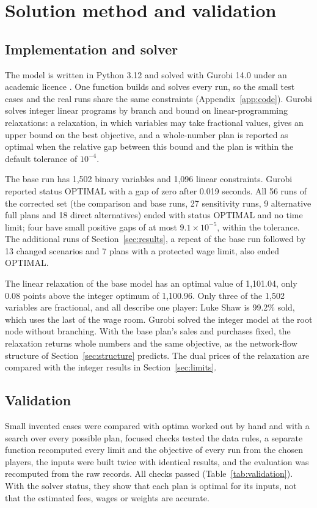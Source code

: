 \section{Solution method and validation}\label{sec:method}

\subsection{Implementation and solver}

The model is written in Python 3.12 and solved with Gurobi 14.0 under an academic licence \citep{gurobi2026}. One function builds and solves every run, so the small test cases and the real runs share the same constraints (Appendix~\ref{app:code}). Gurobi solves integer linear programs by branch and bound on linear-programming relaxations: a relaxation, in which variables may take fractional values, gives an upper bound on the best objective, and a whole-number plan is reported as optimal when the relative gap between this bound and the plan is within the default tolerance of $10^{-4}$.

The base run has 1,502 binary variables and 1,096 linear constraints. Gurobi reported status OPTIMAL with a gap of zero after 0.019 seconds. All 56 runs of the corrected set (the comparison and base runs, 27 sensitivity runs, 9 alternative full plans and 18 direct alternatives) ended with status OPTIMAL and no time limit; four have small positive gaps of at most $9.1 \times 10^{-5}$, within the tolerance. The additional runs of Section~\ref{sec:results}, a repeat of the base run followed by 13 changed scenarios and 7 plans with a protected wage limit, also ended OPTIMAL.

The linear relaxation of the base model has an optimal value of 1,101.04, only 0.08 points above the integer optimum of 1,100.96. Only three of the 1,502 variables are fractional, and all describe one player: Luke Shaw is 99.2\% sold, which uses the last of the wage room. Gurobi solved the integer model at the root node without branching. With the base plan's sales and purchases fixed, the relaxation returns whole numbers and the same objective, as the network-flow structure of Section~\ref{sec:structure} predicts. The dual prices of the relaxation are compared with the integer results in Section~\ref{sec:limits}.

\subsection{Validation}

Small invented cases were compared with optima worked out by hand and with a search over every possible plan, focused checks tested the data rules, a separate function recomputed every limit and the objective of every run from the chosen players, the inputs were built twice with identical results, and the evaluation was recomputed from the raw records. All checks passed (Table~\ref{tab:validation}). With the solver status, they show that each plan is optimal for its inputs, not that the estimated fees, wages or weights are accurate.
